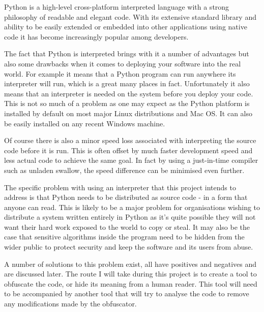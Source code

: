 \documentclass{report}
\begin{document}
Python is a high-level cross-platform interpreted language with a
strong philosophy of readable and elegant code. With its extensive
standard library and ability to be easily extended or embedded into
other applications using native code it has become increasingly
popular among developers.

The fact that Python is interpreted brings with it a number of
advantages but also some drawbacks when it comes to deploying your
software into the real world. For example it means that a Python
program can run anywhere its interpreter will run, which is a great
many places in fact. Unfortunately it also means that an
interpreter is needed on the system before you deploy your code.
This is not so much of a problem as one may expect as the Python
platform is installed by default on most major Linux distributions
and Mac OS. It can also be easily installed on any recent Windows
machine.

Of course there is also a minor speed loss associated with
interpreting the source code before it is run. This is often offset
by much faster development speed and less actual code to achieve
the same goal. In fact by using a just-in-time compiler such as
unladen swallow, the speed difference can be minimised even
further.

The specific problem with using an interpreter that this project
intends to address is that Python needs to be distributed as source
code - in a form that anyone can read. This is likely to be a major
problem for organisations wishing to distribute a system written
entirely in Python as it's quite possible they will not want their
hard work exposed to the world to copy or steal. It may also be the
case that sensitive algorithms inside the program need to be hidden
from the wider public to protect security and keep the software and
its users from abuse.

A number of solutions to this problem exist, all have positives and
negatives and are discussed later. The route I will take during
this project is to create a tool to obfuscate the code, or hide its
meaning from a human reader. This tool will need to be accompanied
by another tool that will try to analyse the code to remove any
modifications made by the obfuscator.
\end{document}
